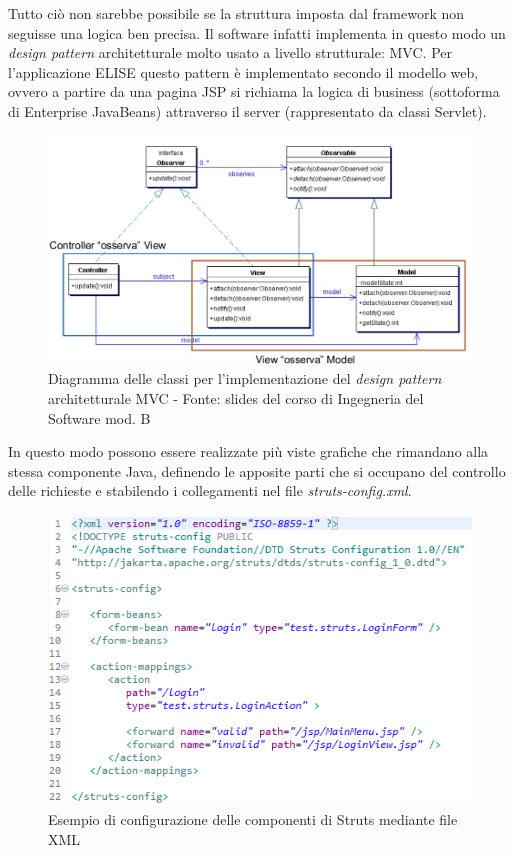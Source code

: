 	Tutto ciò non sarebbe possibile se la struttura imposta dal framework non seguisse una logica ben precisa. Il software infatti implementa in questo modo un \textit{design pattern} architetturale molto usato a livello strutturale: MVC\glossario . Per l'applicazione ELISE questo pattern è implementato secondo il modello web, ovvero a partire da una pagina JSP si richiama la logica di business (sottoforma di Enterprise JavaBeans) attraverso il server (rappresentato da classi Servlet). 
	
	\begin{figure}[H]
		\centering
	   	\includegraphics[width=1\textwidth]{immagini/diagramma_MVC}
	   	\caption{Diagramma delle classi per l'implementazione del \textit{design pattern} architetturale MVC - Fonte: slides del corso di Ingegneria del Software mod. B}
	\end{figure}
	
	In questo modo possono essere realizzate più viste grafiche che rimandano alla stessa componente Java, definendo le apposite parti che si occupano del controllo delle richieste e stabilendo i collegamenti nel file \textit{struts-config.xml}.
	
	\begin{figure}[H]
		\centering
	   	\includegraphics[width=1\textwidth]{immagini/struts_config}
	   	\caption{Esempio di configurazione delle componenti di Struts mediante file XML}
	\end{figure}	
	
